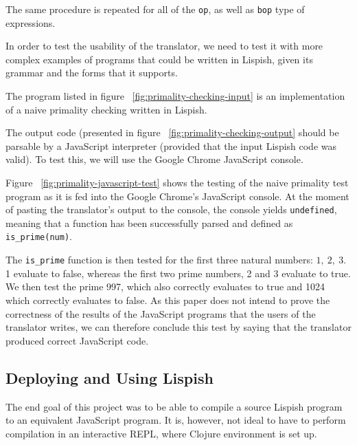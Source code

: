 The same procedure is repeated for all of the \texttt{op}, as well as \texttt{bop} type of expressions.

In order to test the usability of the translator, we need to test it with more complex examples of programs that could be written in Lispish, given its grammar and the forms that it supports.



The program listed in figure ~\ref{fig:primality-checking-input} is an implementation of a naive primality checking written in Lispish. 



The output code (presented in figure ~\ref{fig:primality-checking-output} should be parsable by a JavaScript interpreter (provided that the input Lispish code was valid). To test this, we will use the Google Chrome JavaScript console.



Figure ~\ref{fig:primality-javascript-test} shows the testing of the naive primality test program as it is fed into the Google Chrome's JavaScript console. 
At the moment of pasting the translator's output to the console, the console yields \texttt{undefined}, meaning that a function has been successfully parsed and defined as \texttt{is\_prime(num)}. 

The \texttt{{is\_prime}} function is then tested for the first three natural numbers: $1, \ 2, \ 3 $. 1 evaluate to false, whereas the first two prime numbers, 2 and 3 evaluate to true. We then test the prime 997, which also correctly evaluates to true and 1024 which correctly evaluates to false. 
As this paper does not intend to prove the correctness of the results of the JavaScript programs that the users of the translator writes, we can therefore conclude this test by saying that the translator produced correct JavaScript code. 

\subsection{Deploying and Using Lispish}
The end goal of this project was to be able to compile a source Lispish program to an equivalent JavaScript program.
It is, however, not ideal to have to perform compilation in an interactive REPL, where Clojure environment is set up. 

